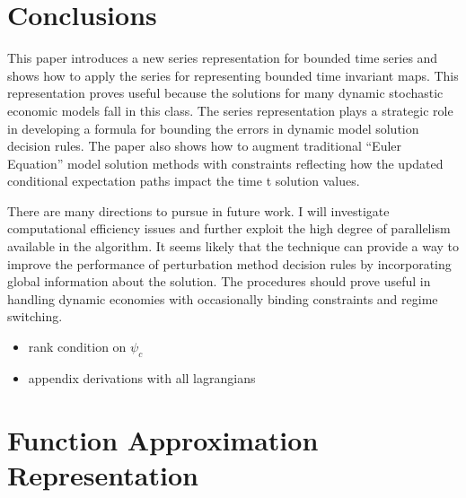 \documentclass[12pt]{article}
\begin{document}
\section{Conclusions}
This paper introduces a new series representation for bounded time series and
shows how to apply the series for representing bounded time invariant maps.
This representation proves useful because the solutions for many
dynamic stochastic economic models fall in this class.
The series representation plays a strategic role in developing a formula for bounding the errors in dynamic model solution decision rules.  The paper
also shows how to  augment traditional ``Euler Equation'' model solution
methods with constraints reflecting how the updated
conditional expectation paths impact the time t solution values.


There are many directions to pursue in future work.
I will investigate computational efficiency issues and further
exploit the high degree of parallelism available in the algorithm.
It seems likely that the technique can provide a way to improve 
the performance of  perturbation method
decision rules by incorporating global information about the solution.
The procedures should prove useful
in handling dynamic economies with occasionally binding constraints\citep{holden15:_exist_dsge,guerrieri15:_occbin} and regime switching.

\label{sec:conc}






\appendix


\begin{itemize}
\item rank condition on $\psi_c$
\item appendix derivations with all lagrangians
\end{itemize}

\section{Function Approximation Representation}
\label{sec:funcApproxRep}
\end{document}
